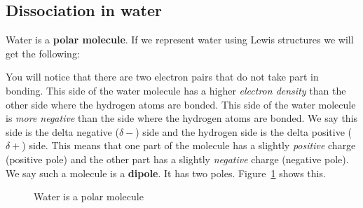             \subsection*{Dissociation in water}
            \nopagebreak
        \label{m38720*id335324}Water is a \textbf{polar molecule}. If we represent water using Lewis structures we will get the following:
\begin{figure}[H]
\begin{center}
\end{center}
\end{figure}
You will notice that there are two electron pairs that do not take part in bonding. This side of the water molecule has a higher \textsl{electron density} than the other side where the hydrogen atoms are bonded. This side of the water molecule is \textsl{more negative} than the side where the hydrogen atoms are bonded. We say this side is the delta negative ($\delta -$) side and the hydrogen side is the delta positive ($\delta +$) side. This means that one part of the molecule has a slightly \textsl{positive} charge (positive pole) and the other part has a slightly \textsl{negative} charge (negative pole). We say such a molecule is a \textbf{dipole}. It has two poles. Figure~\ref{fig:hydrosphere:water} shows this.\par 
    \setcounter{subfigure}{0}
\begin{figure}[H]
\begin{center}
\end{center}
\caption{Water is a polar molecule}
\label{fig:hydrosphere:water}
\end{figure}
